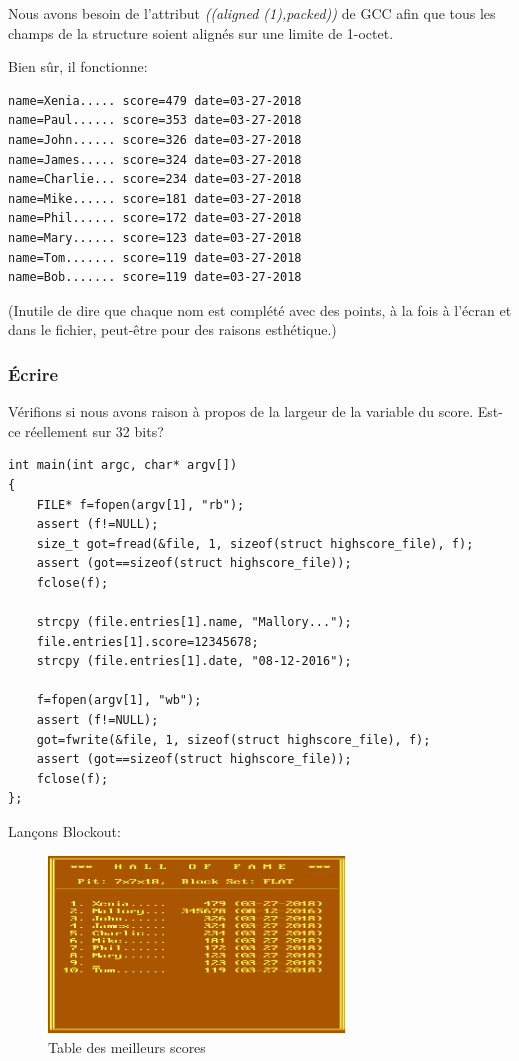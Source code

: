Nous avons besoin de l'attribut \emph{((aligned (1),packed))} de GCC afin que tous
les champs de la structure soient alignés sur une limite de 1-octet.

Bien sûr, il fonctionne:

\begin{lstlisting}
name=Xenia..... score=479 date=03-27-2018
name=Paul...... score=353 date=03-27-2018
name=John...... score=326 date=03-27-2018
name=James..... score=324 date=03-27-2018
name=Charlie... score=234 date=03-27-2018
name=Mike...... score=181 date=03-27-2018
name=Phil...... score=172 date=03-27-2018
name=Mary...... score=123 date=03-27-2018
name=Tom....... score=119 date=03-27-2018
name=Bob....... score=119 date=03-27-2018
\end{lstlisting}

(Inutile de dire que chaque nom est complété avec des points, à la fois à l'écran
et dans le fichier, peut-être pour des raisons esthétique.)

\subsubsection{Écrire}

Vérifions si nous avons raison à propos de la largeur de la variable du score. Est-ce
réellement sur 32 bits?

\begin{lstlisting}[style=customc]
int main(int argc, char* argv[])
{
	FILE* f=fopen(argv[1], "rb");
	assert (f!=NULL);
	size_t got=fread(&file, 1, sizeof(struct highscore_file), f);
	assert (got==sizeof(struct highscore_file));
	fclose(f);

	strcpy (file.entries[1].name, "Mallory...");
	file.entries[1].score=12345678;
	strcpy (file.entries[1].date, "08-12-2016");

	f=fopen(argv[1], "wb");
	assert (f!=NULL);
	got=fwrite(&file, 1, sizeof(struct highscore_file), f);
	assert (got==sizeof(struct highscore_file));
	fclose(f);
};
\end{lstlisting}

Lançons Blockout:

\begin{figure}[H]
\centering
\includegraphics[width=0.7\textwidth]{advanced/550_more_structs/blockout/hs345678.png}
\caption{Table des meilleurs scores}
\end{figure}

